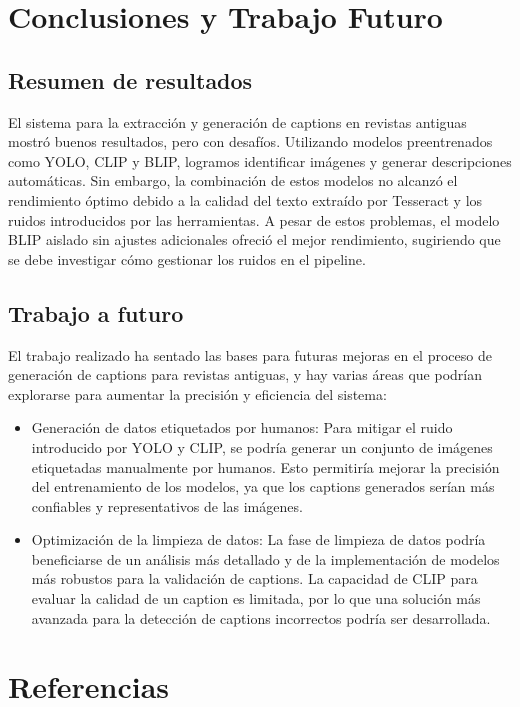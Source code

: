 \documentclass[14pt]{extarticle}
\begin{document}
\section{Conclusiones y Trabajo Futuro}

\subsection{Resumen de resultados}

El sistema para la extracción y generación de captions en revistas antiguas mostró buenos resultados, pero con desafíos. Utilizando modelos preentrenados como YOLO, CLIP y BLIP, logramos identificar imágenes y generar descripciones automáticas. Sin embargo, la combinación de estos modelos no alcanzó el rendimiento óptimo debido a la calidad del texto extraído por Tesseract y los ruidos introducidos por las herramientas. A pesar de estos problemas, el modelo BLIP aislado sin ajustes adicionales ofreció el mejor rendimiento, sugiriendo que se debe investigar cómo gestionar los ruidos en el pipeline.

\subsection{Trabajo a futuro}

El trabajo realizado ha sentado las bases para futuras mejoras en el proceso de generación de captions para revistas antiguas, y hay varias áreas que podrían explorarse para aumentar la precisión y eficiencia del sistema:
\begin{itemize}
    \item Generación de datos etiquetados por humanos: Para mitigar el ruido introducido por YOLO y CLIP, se podría generar un conjunto de imágenes etiquetadas manualmente por humanos. Esto permitiría mejorar la precisión del entrenamiento de los modelos, ya que los captions generados serían más confiables y representativos de las imágenes.
    \item Optimización de la limpieza de datos: La fase de limpieza de datos podría beneficiarse de un análisis más detallado y de la implementación de modelos más robustos para la validación de captions. La capacidad de CLIP para evaluar la calidad de un caption es limitada, por lo que una solución más avanzada para la detección de captions incorrectos podría ser desarrollada.
\end{itemize}

\section{Referencias}
\end{document}
